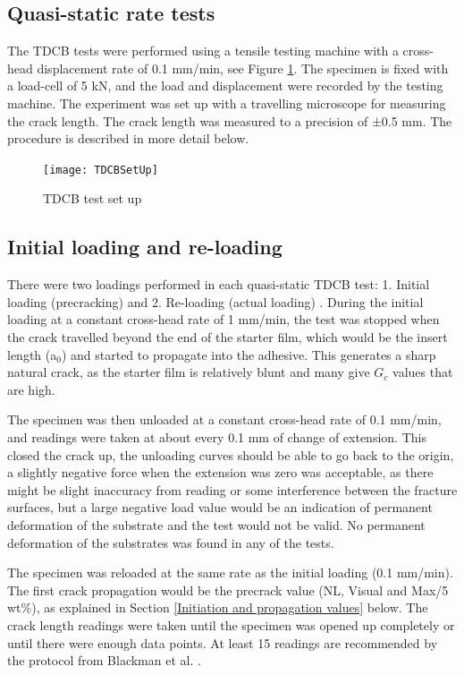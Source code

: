 \documentclass[numbers=noendperiod,chapterprefix=on]{icldt} %
\begin{document}
\subsection{Quasi-static rate tests}
The TDCB tests were performed using a tensile testing machine with a cross-head displacement rate of 0.1 mm/min, see Figure \ref{TDCBSetUp}. The specimen is fixed with a load-cell of 5 kN, and the load and displacement were recorded by the testing machine. The experiment was set up with a travelling microscope for measuring the crack length. The crack length was measured to a precision of ±0.5 mm. The procedure is described in more detail below.
\begin{figure}[!htpb]
\centering
\texttt{[image: TDCBSetUp]}
\caption{TDCB test set up} \label{TDCBSetUp}
\end{figure}
\FloatBarrier
\subsection{Initial loading and re-loading}
There were two loadings performed in each quasi-static TDCB test: 1. Initial loading (precracking) and 2. Re-loading (actual loading) \cite{Kinloch1990}.
During the initial loading at a constant cross-head rate of 1 mm/min, the test was stopped when the crack travelled beyond the end of the starter film, which would be the insert length (a$_0$) and started to propagate into the adhesive.
This generates a sharp natural crack, as the starter film is relatively blunt and many give $ G_{c} $ values that are high.

The specimen was then unloaded at a constant cross-head rate of 0.1 mm/min, and readings were taken at about every 0.1 mm of change of extension. This closed the crack up, the unloading curves should be able to go back to the origin, a slightly negative force when the extension was zero was acceptable, as there might be slight inaccuracy from reading or some interference between the fracture surfaces, but a large negative load value would be an indication of permanent deformation of the substrate and the test would not be valid. No permanent deformation of the substrates was found in any of the tests. 

The specimen was reloaded at the same rate as the initial loading (0.1 mm/min). The first crack propagation would be the precrack value (NL, Visual and Max/5 wt\%), as explained in Section \ref{Initiation and propagation values} below. The crack length readings were taken until the specimen was opened up completely or until there were enough data points. At least 15 readings are recommended by the protocol from Blackman et al. \cite{Blackman1995}.
\end{document}
